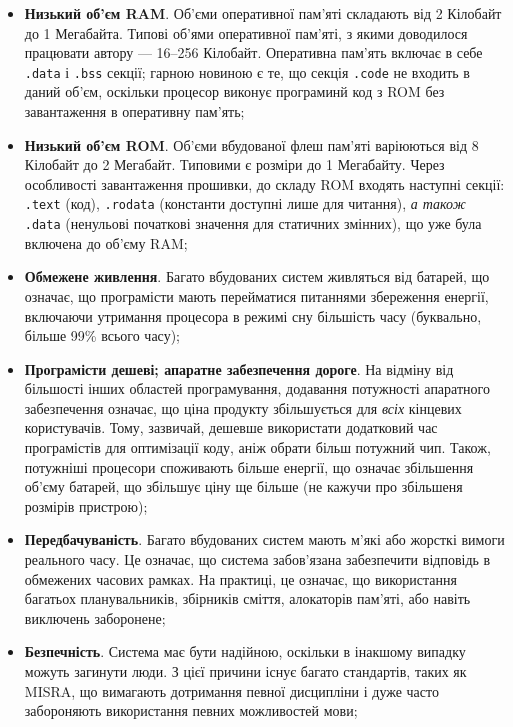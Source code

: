 \documentclass[main.tex]{subfiles}
\begin{document}
\newcommand\elfsection[1]{\texttt{#1}}

\begin{itemize}[nosep]
\item \textbf{Низький об'єм RAM}. Об'єми оперативної пам'яті складають від 2 Кілобайт до 1 Мегабайта. Типові об'ями оперативної пам'яті, з якими доводилося працювати автору --- 16--256 Кілобайт. Оперативна пам'ять включає в себе \elfsection{.data} і \elfsection{.bss} секції; гарною новиною є те, що секція \elfsection{.code} не входить в даний об'єм, оскільки процесор виконує програминй код з ROM без завантаження в оперативну пам'ять;

\item \textbf{Низький об'єм ROM}. Об'єми вбудованої флеш пам'яті варіюються від 8 Кілобайт до 2 Мегабайт. Типовими є розміри до 1 Мегабайту. Через особливості завантаження прошивки, до складу ROM входять наступні секції: \elfsection{.text} (код), \elfsection{.rodata} (константи доступні лише для читання), \emph{а також} \elfsection{.data} (ненульові початкові значення для статичних змінних), що уже була включена до об'єму RAM;

\item \textbf{Обмежене живлення}. Багато вбудованих систем живляться від батарей, що означає, що програмісти мають перейматися питаннями збереження енергії, включаючи утримання процесора в режимі сну більшість часу (буквально, більше 99\% всього часу\cite{processor-sleep});

\item \textbf{Програмісти дешеві; апаратне забезпечення дороге}. На відміну від більшості інших областей програмування\cite{hardware-is-cheap}, додавання потужності апаратного забезпечення означає, що ціна продукту збільшується для \emph{всіх} кінцевих користувачів. Тому, зазвичай, дешевше використати додатковий час програмістів для оптимізації коду, аніж обрати більш потужний чип. Також, потужніші процесори споживають більше енергії, що означає збільшення об'єму батарей, що збільшує ціну ще більше (не кажучи про збільшеня розмірів пристрою);

\item \textbf{Передбачуваність}. Багато вбудованих систем мають м'які або жорсткі вимоги реального часу. Це означає, що система забов'язана забезпечити відповідь в обмежених часових рамках. На практиці, це означає, що використання багатьох планувальників, збірників сміття, алокаторів пам'яті, або навіть виключень заборонене;

\item \textbf{Безпечність}. Система має бути надійною, оскільки в інакшому випадку можуть загинути люди. З цієї причини існує багато стандартів, таких як MISRA\cite{misra}, що вимагають дотримання певної дисципліни і дуже часто забороняють використання певних можливостей мови;


\end{itemize}
\end{document}
